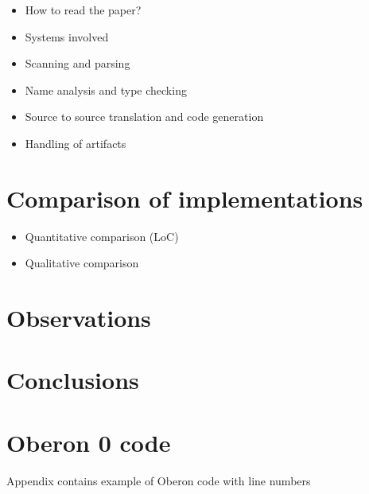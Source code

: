 \documentclass[english,preprint,12pt]{elsarticle}
\begin{document}
\begin{itemize}
\item How to read the paper?
\item Systems involved
\item Scanning and parsing
\item Name analysis and type checking
\item Source to source translation and code generation
\item Handling of artifacts
\end{itemize}












\section{Comparison of implementations}
\label{sec:comparison}
\begin{itemize}
\item Quantitative comparison (LoC)
\item Qualitative comparison
\end{itemize}

\section{Observations}
\label{sec:observations}

\section{Conclusions}
\label{sec:conclusions}



\appendix

\section{Oberon 0 code}
\label{sec:samples}
Appendix contains example of Oberon code with line numbers



\end{document}
